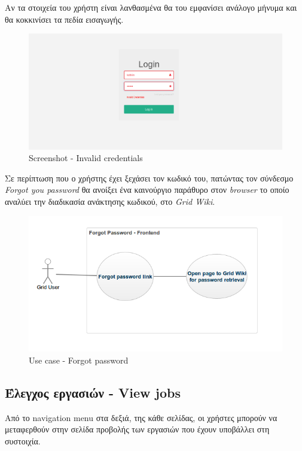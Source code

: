 Αν τα στοιχεία του χρήστη είναι λανθασμένα θα του εμφανίσει ανάλογο μήνυμα και θα κοκκινίσει τα πεδία εισαγωγής.

\begin{figure}[t]
\caption{Screenshot - Invalid credentials}
\includegraphics[width=16cm]{../images/invalid-credentials-screenshot.png}
\centering
\end{figure}
\clearpage

Σε περίπτωση που ο χρήστης έχει ξεχάσει τον κωδικό του, πατώντας τον σύνδεσμο \textit{Forgot you password} θα ανοίξει ένα καινούργιο παράθυρο στον \textit{browser} το οποίο αναλύει την διαδικασία ανάκτησης κωδικού, στο \textit{Grid Wiki}.

\begin{figure}[t]
\caption{Use case - Forgot password}
\includegraphics[width=16cm]{../images/forgot-password-case.png}
\centering
\end{figure}
\clearpage


\subsection{Έλεγχος εργασιών - View jobs}

Από το navigation menu στα δεξιά, της κάθε σελίδας, οι χρήστες μπορούν να μεταφερθούν στην σελίδα προβολής των εργασιών που έχουν υποβάλλει στη συστοιχία.

